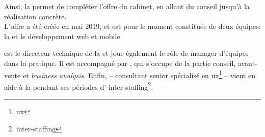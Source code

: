 Ainsi, la \df permet de compléter l'offre du cabinet, en allant du conseil jusqu'à la réalisation concrète.\\
L'offre a été créée en mai 2019, et est pour le moment constituée de deux équipes: la \ds et le développement web et mobile.


\damien est le directeur technique de la \df et joue également le rôle de manager d'équipes dans la pratique. Il est accompagné par \gil, qui s'occupe de la partie conseil, avant-vente et \textit{business analysis}. Enfin, \stefan -- consultant senior spécialisé en
\gls{ux}\footnote{\glsdesc{ux}}
-- vient en aide à la \df pendant ses périodes d'
\gls{inter-staffing}\footnote{\glsdesc{inter-staffing}}.